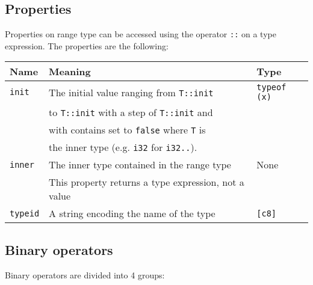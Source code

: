 \subsection {Properties}

Properties on range type can be accessed using the operator \texttt{::} on a
type expression. The properties are the following:

\begin{center}\begin{adjustbox}{max width=\linewidth}
  \begin{tabular}{|l|ll|}
    \hline
    Name & Meaning & Type\\
    \hline
    \hline
    \texttt{init} & The initial value ranging from \texttt{T::init} & \texttt{typeof (x)}\\
    & to \texttt{T::init} with a step of \texttt{T::init} and & \\
    & with contains set to \texttt{false} where \texttt{T} is & \\
    & the inner type (e.g. \texttt{i32} for \texttt{i32..}). &\\
    \Xhline{0.001pt}
    \texttt{inner} & The inner type contained in the range type & None \\
    & This property returns a type expression, not a value & \\
    \hline
    \texttt{typeid} & A string encoding the name of the type & \texttt{[c8]} \\
    \hline
  \end{tabular}
\end{adjustbox}\end{center}


\subsection {Binary operators}

Binary operators are divided into 4 groups:

